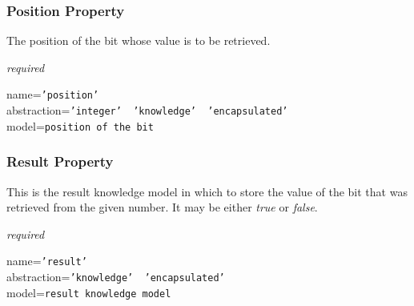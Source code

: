 \subsubsection{Position Property}

The position of the bit whose value is to be retrieved.

\emph{required}

name=\texttt{'position'}\\
abstraction=\texttt{'integer' \vline\ 'knowledge' \vline\ 'encapsulated'}\\
model=\texttt{position of the bit}

\subsubsection{Result Property}

This is the result knowledge model in which to store the value of the bit that
was retrieved from the given number. It may be either \emph{true} or \emph{false}.

\emph{required}

name=\texttt{'result'}\\
abstraction=\texttt{'knowledge' \vline\ 'encapsulated'}\\
model=\texttt{result knowledge model}
